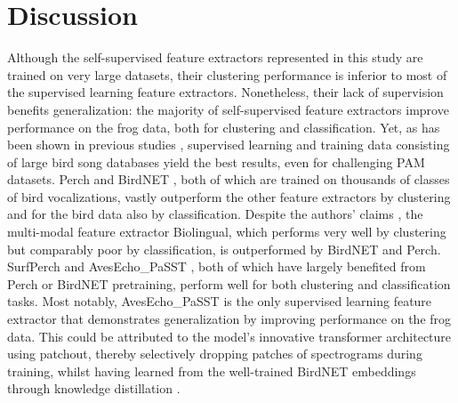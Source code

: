 \section{Discussion}
\label{sec:discussion}

Although the self-supervised feature extractors represented in this study are trained on very large datasets, their clustering performance is inferior to most of the supervised learning feature extractors.
Nonetheless, their lack of supervision benefits generalization: the majority of self-supervised feature extractors improve performance on the frog data, both for clustering and classification.
Yet, as has been shown in previous studies \cite{ghani_global_2023}, supervised learning and training data consisting of large bird song databases yield the best results, even for challenging PAM datasets.
Perch and BirdNET \cite{kahl_birdnet_2021}, both of which are trained on thousands of classes of bird vocalizations, vastly outperform the other feature extractors by clustering and for the bird data also by classification. 
Despite the authors' claims \cite{robinson_transferable_2023}, the multi-modal feature extractor Biolingual, which performs very well by clustering but comparably poor by classification, is outperformed by BirdNET and Perch.
SurfPerch \cite{williams_leveraging_2024} and AvesEcho\_PaSST \cite{ghani_generalization_2024}, both of which have largely benefited from Perch or BirdNET pretraining, perform well for both clustering and classification tasks.
Most notably, AvesEcho\_PaSST is the only supervised learning feature extractor that demonstrates generalization by improving performance on the frog data.
This could be attributed to the model's innovative transformer architecture using patchout, thereby selectively dropping patches of spectrograms during training, whilst having learned from the well-trained BirdNET embeddings through knowledge distillation \cite{ghani_generalization_2024}.


